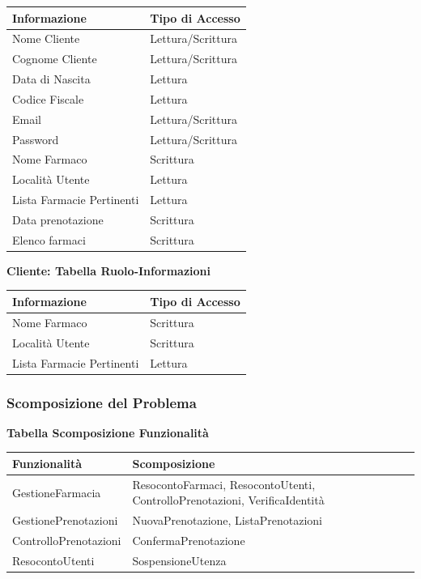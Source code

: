 \begin{tabular} {|P{7cm}|P{7cm}|}
    \hline
    \textbf{Informazione} & \textbf{Tipo di Accesso} \\
    \hline
    Nome Cliente & Lettura/Scrittura \\ 
    \hline
    Cognome Cliente & Lettura/Scrittura \\
    \hline
    Data di Nascita & Lettura \\
    \hline
    Codice Fiscale & Lettura \\
    \hline
    Email & Lettura/Scrittura \\
    \hline
    Password & Lettura/Scrittura \\
    \hline
    Nome Farmaco & Scrittura \\
    \hline
    Località Utente & Lettura \\
    \hline
    Lista Farmacie Pertinenti  & Lettura \\
    \hline
    Data prenotazione & Scrittura \\
    \hline
    Elenco farmaci & Scrittura \\
    \hline
\end{tabular}

\textbf{Cliente: Tabella Ruolo-Informazioni}
\hfill \break

\begin{tabular} {|P{7cm}|P{7cm}|}
    \hline
    \textbf{Informazione} & \textbf{Tipo di Accesso} \\
    \hline
    Nome Farmaco & Scrittura \\
    \hline
    Località Utente & Scrittura \\
    \hline
    Lista Farmacie Pertinenti  & Lettura \\
    \hline
\end{tabular}
\hfill \break
\hfill \break

\subsubsection{Scomposizione del Problema}
\hfill \break

\textbf{Tabella Scomposizione Funzionalità}
\hfill \break

\begin{tabular} {|P{7cm}|P{7cm}|}
    \hline
    \textbf{Funzionalità} & \textbf{Scomposizione} \\
    \hline
    GestioneFarmacia &  ResocontoFarmaci, ResocontoUtenti, ControlloPrenotazioni, VerificaIdentità  \\
    \hline
    GestionePrenotazioni  &  NuovaPrenotazione, ListaPrenotazioni  \\
    \hline
    ControlloPrenotazioni  &  ConfermaPrenotazione  \\
    \hline
    ResocontoUtenti &  SospensioneUtenza  \\
    \hline
\end{tabular}
\\

